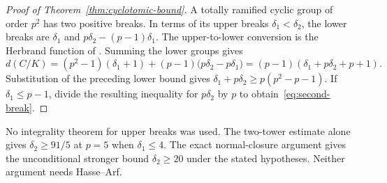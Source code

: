 \begin{proof}[Proof of Theorem~\ref{thm:cyclotomic-bound}]
A totally ramified cyclic group of order $p^2$ has two positive breaks. In terms of its upper breaks $\delta_1<\delta_2$, the lower breaks are $\delta_1$ and $p\delta_2-(p-1)\delta_1$. The upper-to-lower conversion is the Herbrand function of \citet[Chapter~IV, \S3, pp.~73--76]{Serre1979}. Summing the lower groups gives
\[
 d(C/K)=(p^2-1)(\delta_1+1)
 +(p-1)\bigl(p\delta_2-p\delta_1\bigr)
 =(p-1)(\delta_1+p\delta_2+p+1).
\]
Substitution of the preceding lower bound gives
$\delta_1+p\delta_2\ge p(p^2-p-1)$. If $\delta_1\le p-1$, divide the resulting inequality for $p\delta_2$ by $p$ to obtain~\eqref{eq:second-break}.
\end{proof}

\begin{remark}
No integrality theorem for upper breaks was used. The two-tower estimate alone gives $\delta_2\ge91/5$ at $p=5$ when $\delta_1\le4$. The exact normal-closure argument gives the unconditional stronger bound $\delta_2\ge20$ under the stated hypotheses. Neither argument needs Hasse--Arf.
\end{remark}
